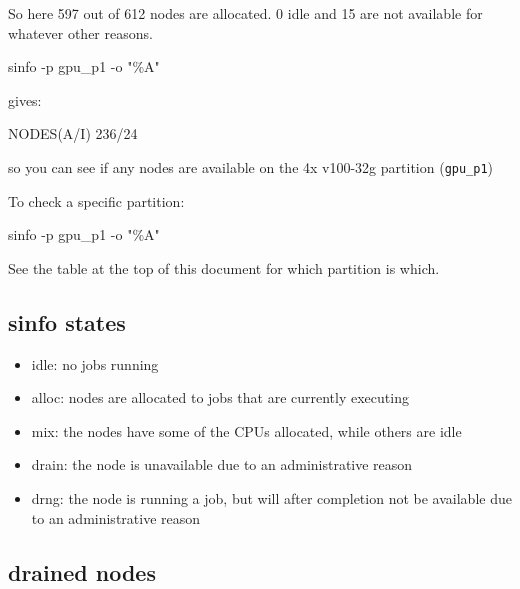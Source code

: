 \documentclass[
]{report}
\newenvironment{Shaded}{\begin{snugshade}}{\end{snugshade}}
\newcommand{\AttributeTok}[1]{\textcolor[rgb]{0.40,0.45,0.13}{#1}}
\newcommand{\ErrorTok}[1]{\textcolor[rgb]{0.68,0.00,0.00}{#1}}
\newcommand{\ExtensionTok}[1]{\textcolor[rgb]{0.00,0.23,0.31}{#1}}
\newcommand{\KeywordTok}[1]{\textcolor[rgb]{0.00,0.23,0.31}{#1}}
\newcommand{\NormalTok}[1]{\textcolor[rgb]{0.00,0.23,0.31}{#1}}
\newcommand{\StringTok}[1]{\textcolor[rgb]{0.13,0.47,0.30}{#1}}
\providecommand{\tightlist}{%
  \setlength{\itemsep}{0pt}\setlength{\parskip}{0pt}}\usepackage{longtable,booktabs,array}
\begin{document}
So here 597 out of 612 nodes are allocated. 0 idle and 15 are not
available for whatever other reasons.

\begin{Shaded}
\begin{Highlighting}[]
\ExtensionTok{sinfo} \AttributeTok{{-}p}\NormalTok{ gpu\_p1 }\AttributeTok{{-}o} \StringTok{"\%A"}
\end{Highlighting}
\end{Shaded}

gives:

\begin{Shaded}
\begin{Highlighting}[]
\ExtensionTok{NODES}\ErrorTok{(}\ExtensionTok{A/I}\KeywordTok{)}
\ExtensionTok{236/24}
\end{Highlighting}
\end{Shaded}

so you can see if any nodes are available on the 4x v100-32g partition
(\texttt{gpu\_p1})

To check a specific partition:

\begin{Shaded}
\begin{Highlighting}[]
\ExtensionTok{sinfo} \AttributeTok{{-}p}\NormalTok{ gpu\_p1 }\AttributeTok{{-}o} \StringTok{"\%A"}
\end{Highlighting}
\end{Shaded}

See the table at the top of this document for which partition is which.

\subsection{sinfo states}\label{sinfo-states}

\begin{itemize}
\tightlist
\item
  idle: no jobs running
\item
  alloc: nodes are allocated to jobs that are currently executing
\item
  mix: the nodes have some of the CPUs allocated, while others are idle
\item
  drain: the node is unavailable due to an administrative reason
\item
  drng: the node is running a job, but will after completion not be
  available due to an administrative reason
\end{itemize}

\subsection{drained nodes}\label{drained-nodes}
\end{document}
